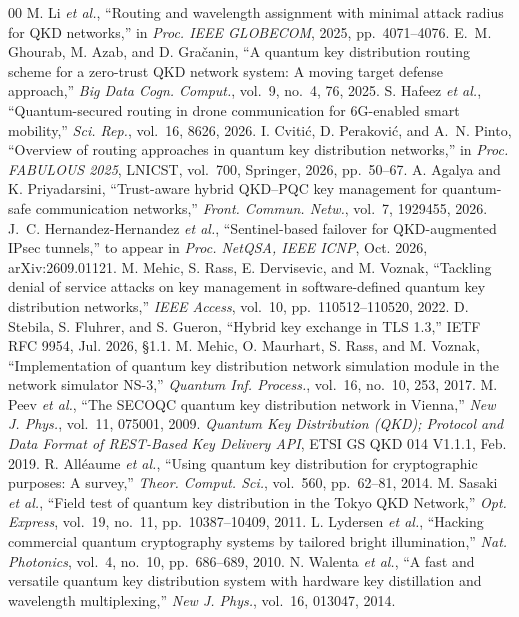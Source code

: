 \documentclass[conference,a4paper]{IEEEtran}
\begin{document}
\begin{thebibliography}{00}
 M. Li \emph{et al.}, ``Routing and wavelength assignment with minimal attack radius for QKD networks,'' in \emph{Proc. IEEE GLOBECOM}, 2025, pp.~4071--4076.
 E.~M. Ghourab, M. Azab, and D. Gra\v{c}anin, ``A quantum key distribution routing scheme for a zero-trust QKD network system: A moving target defense approach,'' \emph{Big Data Cogn. Comput.}, vol.~9, no.~4, 76, 2025.
 S. Hafeez \emph{et al.}, ``Quantum-secured routing in drone communication for 6G-enabled smart mobility,'' \emph{Sci. Rep.}, vol.~16, 8626, 2026.
 I. Cviti\'c, D. Perakovi\'c, and A.~N. Pinto, ``Overview of routing approaches in quantum key distribution networks,'' in \emph{Proc. FABULOUS 2025}, LNICST, vol.~700, Springer, 2026, pp.~50--67.
 A. Agalya and K. Priyadarsini, ``Trust-aware hybrid QKD--PQC key management for quantum-safe communication networks,'' \emph{Front. Commun. Netw.}, vol.~7, 1929455, 2026.
 J.~C. Hernandez-Hernandez \emph{et al.}, ``Sentinel-based failover for QKD-augmented IPsec tunnels,'' to appear in \emph{Proc. NetQSA, IEEE ICNP}, Oct. 2026, arXiv:2609.01121.
 M. Mehic, S. Rass, E. Dervisevic, and M. Voznak, ``Tackling denial of service attacks on key management in software-defined quantum key distribution networks,'' \emph{IEEE Access}, vol.~10, pp.~110512--110520, 2022.
 D. Stebila, S. Fluhrer, and S. Gueron, ``Hybrid key exchange in TLS 1.3,'' IETF RFC 9954, Jul. 2026, \S1.1.
 M. Mehic, O. Maurhart, S. Rass, and M. Voznak, ``Implementation of quantum key distribution network simulation module in the network simulator NS-3,'' \emph{Quantum Inf. Process.}, vol.~16, no.~10, 253, 2017.
 M. Peev \emph{et al.}, ``The SECOQC quantum key distribution network in Vienna,'' \emph{New J. Phys.}, vol.~11, 075001, 2009.
 \emph{Quantum Key Distribution (QKD); Protocol and Data Format of REST-Based Key Delivery API}, ETSI GS QKD 014 V1.1.1, Feb. 2019.
 R. All\'eaume \emph{et al.}, ``Using quantum key distribution for cryptographic purposes: A survey,'' \emph{Theor. Comput. Sci.}, vol.~560, pp.~62--81, 2014.
 M. Sasaki \emph{et al.}, ``Field test of quantum key distribution in the Tokyo QKD Network,'' \emph{Opt. Express}, vol.~19, no.~11, pp.~10387--10409, 2011.
 L. Lydersen \emph{et al.}, ``Hacking commercial quantum cryptography systems by tailored bright illumination,'' \emph{Nat. Photonics}, vol.~4, no.~10, pp.~686--689, 2010.
 N. Walenta \emph{et al.}, ``A fast and versatile quantum key distribution system with hardware key distillation and wavelength multiplexing,'' \emph{New J. Phys.}, vol.~16, 013047, 2014.

\end{thebibliography}
\end{document}
